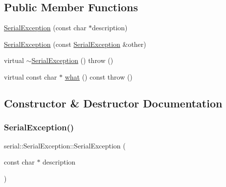 \subsection*{Public Member Functions}
\begin{DoxyCompactItemize}
\item 
\mbox{\hyperlink{classserial_1_1_serial_exception_ab761c0c6e5350bb30f2be40dd6073145}{Serial\+Exception}} (const char $\ast$description)
\item 
\mbox{\hyperlink{classserial_1_1_serial_exception_a6fdfaff3c76d75f1482944ff9ac1cfbe}{Serial\+Exception}} (const \mbox{\hyperlink{classserial_1_1_serial_exception}{Serial\+Exception}} \&other)
\item 
virtual \mbox{\hyperlink{classserial_1_1_serial_exception_a8504adb442f224ec2798e4bd33115fe3}{$\sim$\+Serial\+Exception}} ()  throw ()
\item 
virtual const char $\ast$ \mbox{\hyperlink{classserial_1_1_serial_exception_a8243a4e5c5414834d3ac347c325b961f}{what}} () const  throw ()
\end{DoxyCompactItemize}


\subsection{Constructor \& Destructor Documentation}
\mbox{\label{classserial_1_1_serial_exception_ab761c0c6e5350bb30f2be40dd6073145}} 
\subsubsection{\texorpdfstring{Serial\+Exception()}{SerialException()}\hspace{0.1cm}{\footnotesize\ttfamily [1/2]}}
{\footnotesize\ttfamily serial\+::\+Serial\+Exception\+::\+Serial\+Exception (\begin{DoxyParamCaption}\item[{const char $\ast$}]{description }\end{DoxyParamCaption})\hspace{0.3cm}{\ttfamily [inline]}}

\mbox{\label{classserial_1_1_serial_exception_a6fdfaff3c76d75f1482944ff9ac1cfbe}} 
